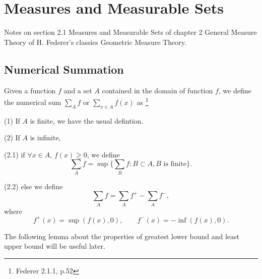 \chapter{Measures and Measurable Sets}

Notes on section 2.1 Measures and Measurable Sets of chapter 2 General Measure 
Theory of H. Federer's classics Geometric Measure Theory.


\section{Numerical Summation}

\begin{definition} \label{D:sum}
Given a function $f$ and a set $A$ contained in the domain of function $f$, we
define the numerical sum $\sum_A f$ or $\sum_{x\in A} f(x)$ as
\footnote{Federer 2.1.1, p.52}

(1) If $A$ is finite, we have the usual defintion.

(2) If $A$ is infinite, 

    (2.1) if $\forall x\in A$, $f(x)\geq 0$, we define
    \begin{equation} \label{E:sum_inf}
      \sum_A f = \sup\{ \sum_B f: B\subset A, \text{$B$ is finite} \}.
    \end{equation}

    (2.2) else we define
    \begin{equation} \label{E:sum_gen}
      \sum_A f = \sum_A f^+ - \sum_A f^-,
    \end{equation}
    where
    \begin{equation}
      f^+(x) = \sup(f(x),0), \qquad  f^-(x) = - \inf(f(x),0).
    \end{equation}
\end{definition}


The following lemma about the properties of greatest lower bound and least 
upper bound will be useful later.

